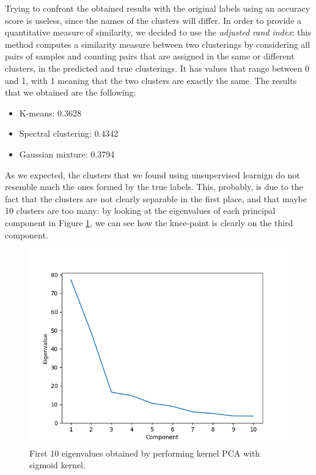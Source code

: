 \documentclass[12pt]{article}
\begin{document}
Trying to confront the obtained results with the original labels using an accuracy score is useless, since the names of the clusters will differ. In order to provide a quantitative measure of similarity, we decided to use the \textit{adjusted rand index}: this method computes a similarity measure between two clusterings by considering all pairs of samples and counting pairs that are assigned in the same or different clusters, in the predicted and true clusterings. It has values that range between 0 and 1, with 1 meaning that the two clusters are exactly the same.\newline
The results that we obtained are the following:
\begin{itemize}
	\item K-means: 0.3628
	\item Spectral clustering: 0.4342
	\item Gaussian mixture: 0.3794
\end{itemize}
As we expected, the clusters that we found using unsupervised learnign do not resemble much the ones formed by the true labels.\newline
This, probably, is due to the fact that the clusters are not clearly separable in the first place, and that maybe 10 clusters are too many: by looking at the eigenvalues of each principal component in Figure \ref{fig:eigenvalues_sigmoid}, we can see how the knee-point is clearly on the third component.
\begin{figure}[h]
	\centering
	\includegraphics[width = 0.7 \textwidth]{eigenvalues_sigmoid.png}
	\caption{First 10 eigenvalues obtained by performing kernel PCA with sigmoid kernel.}
	\label{fig:eigenvalues_sigmoid}
\end{figure}
\end{document}
